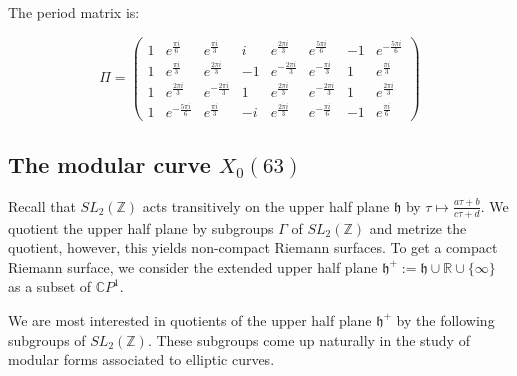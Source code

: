 \documentclass[12pt,reqno]{amsart}
\newcommand{\C}{\mathbb{C}}
\newcommand{\Z}{\mathbb{Z}}
\newcommand{\R}{\mathbb{R}}
\newtheorem*{thm*}{Theorem}
\theoremstyle{definition}
\theoremstyle{remark}
\begin{document}




The period matrix is:

$$\Pi = \begin{pmatrix}
 1 & e^{\frac{\pi i}{6}} & e^{\frac{\pi i}{3}} & i & e^{\frac{2 \pi i}{3}} & e^{\frac{5 \pi i}{6}} & -1 & e^{-\frac{5 \pi i}{6}} \\
 1 & e^{\frac{\pi i}{3}} & e^{\frac{2 \pi i}{3}} & -1 & e^{-\frac{2 \pi i}{3}} & e^{-\frac{\pi i}{3}} & 1 & e^{\frac{\pi i}{3}} \\
 1 & e^{\frac{2 \pi i}{3}} & e^{-\frac{2 \pi i}{3}} & 1 & e^{\frac{2 \pi i}{3}} & e^{-\frac{2 \pi i}{3}} & 1 & e^{\frac{2 \pi i}{3}} \\
 1 & e^{-\frac{5 \pi i}{6}} & e^{\frac{\pi i}{3}} & -i & e^{\frac{2 \pi i}{3}} & e^{-\frac{\pi i}{6}} & -1 & e^{\frac{\pi i}{6}} 
\end{pmatrix}$$
\newpage
 
\subsection*{The modular curve $X_0(63)$}
\label{sec:modular}
Recall that $SL_2(\Z)$ acts transitively on the upper half plane $\mathfrak{h}$ by $\tau \mapsto \frac{a\tau + b}{c\tau + d}$. We quotient the upper half plane by subgroups $\Gamma$ of $SL_2(\Z)$ and metrize the quotient, however, this yields non-compact Riemann surfaces. To get a compact Riemann surface, we consider the extended upper half plane $\mathfrak{h}^{+} := \mathfrak{h} \cup \R \cup \{ \infty \}$ as a subset of $\C P^1$.  

We are most interested in quotients of the upper half plane $\mathfrak{h}^{+}$ by the following subgroups of $SL_2(\Z)$. These subgroups come up naturally in the study of modular forms associated to elliptic curves.
\end{document}
